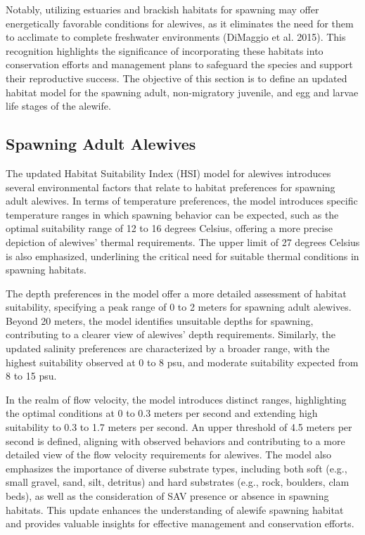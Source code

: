 \documentclass[
]{book}
\begin{document}
Notably, utilizing estuaries and brackish habitats for spawning may offer energetically favorable conditions for alewives, as it eliminates the need for them to acclimate to complete freshwater environments (DiMaggio et al. 2015). This recognition highlights the significance of incorporating these habitats into conservation efforts and management plans to safeguard the species and support their reproductive success. The objective of this section is to define an updated habitat model for the spawning adult, non-migratory juvenile, and egg and larvae life stages of the alewife.

\hypertarget{spawning-adult-alewives-1}{%
\subsection{Spawning Adult Alewives}\label{spawning-adult-alewives-1}}

The updated Habitat Suitability Index (HSI) model for alewives introduces several environmental factors that relate to habitat preferences for spawning adult alewives. In terms of temperature preferences, the model introduces specific temperature ranges in which spawning behavior can be expected, such as the optimal suitability range of 12 to 16 degrees Celsius, offering a more precise depiction of alewives' thermal requirements. The upper limit of 27 degrees Celsius is also emphasized, underlining the critical need for suitable thermal conditions in spawning habitats.

The depth preferences in the model offer a more detailed assessment of habitat suitability, specifying a peak range of 0 to 2 meters for spawning adult alewives. Beyond 20 meters, the model identifies unsuitable depths for spawning, contributing to a clearer view of alewives' depth requirements. Similarly, the updated salinity preferences are characterized by a broader range, with the highest suitability observed at 0 to 8 psu, and moderate suitability expected from 8 to 15 psu.

In the realm of flow velocity, the model introduces distinct ranges, highlighting the optimal conditions at 0 to 0.3 meters per second and extending high suitability to 0.3 to 1.7 meters per second. An upper threshold of 4.5 meters per second is defined, aligning with observed behaviors and contributing to a more detailed view of the flow velocity requirements for alewives. The model also emphasizes the importance of diverse substrate types, including both soft (e.g., small gravel, sand, silt, detritus) and hard substrates (e.g., rock, boulders, clam beds), as well as the consideration of SAV presence or absence in spawning habitats. This update enhances the understanding of alewife spawning habitat and provides valuable insights for effective management and conservation efforts.
\end{document}
